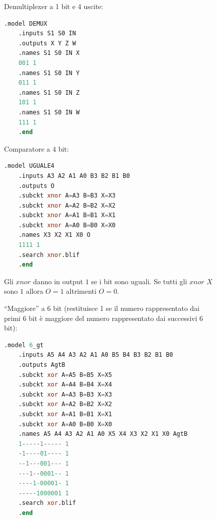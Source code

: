 \documentclass[a4paper]{article}
\theoremstyle{break}
\theoremstyle{break}
\theoremstyle{break}
\theoremstyle{break}
\begin{document}
\begin{figure}[H]
  \begin{example}
    Demultiplexer a 1 bit e 4 uscite:
    \begin{lstlisting}[language=Verilog]
    .model DEMUX
    .inputs S1 S0 IN
    .outputs X Y Z W
    .names S1 S0 IN X
    001 1
    .names S1 S0 IN Y
    011 1
    .names S1 S0 IN Z
    101 1
    .names S1 S0 IN W
    111 1
    .end
    \end{lstlisting}
  \end{example}
\end{figure}
\begin{figure}[H]
  \begin{example}
    Comparatore a 4 bit:
    \begin{lstlisting}[language=Verilog]
    .model UGUALE4
    .inputs A3 A2 A1 A0 B3 B2 B1 B0
    .outputs O
    .subckt xnor A=A3 B=B3 X=X3
    .subckt xnor A=A2 B=B2 X=X2
    .subckt xnor A=A1 B=B1 X=X1
    .subckt xnor A=A0 B=B0 X=X0
    .names X3 X2 X1 X0 O
    1111 1
    .search xnor.blif
    .end
    \end{lstlisting}
    Gli \( xnor \) danno in output \( 1 \) se i bit sono uguali. Se tutti gli \( xnor \) \( X \) 
    sono \( 1 \) allora \( O=1 \) altrimenti \( O=0 \).
  \end{example}
\end{figure}
\begin{figure}[H]
  \begin{example}
    “Maggiore” a 6 bit (restituisce 1 se il numero rappresentato dai primi 6 bit è
    maggiore del numero rappresentato dai successivi 6 bit):
    \begin{lstlisting}[language=Verilog]
    .model 6_gt
    .inputs A5 A4 A3 A2 A1 A0 B5 B4 B3 B2 B1 B0
    .outputs AgtB
    .subckt xor A=A5 B=B5 X=X5
    .subckt xor A=A4 B=B4 X=X4
    .subckt xor A=A3 B=B3 X=X3
    .subckt xor A=A2 B=B2 X=X2
    .subckt xor A=A1 B=B1 X=X1
    .subckt xor A=A0 B=B0 X=X0
    .names A5 A4 A3 A2 A1 A0 X5 X4 X3 X2 X1 X0 AgtB
    1-----1----- 1
    -1----01---- 1
    --1---001--- 1
    ---1--0001-- 1
    ----1-00001- 1
    -----1000001 1
    .search xor.blif
    .end
    \end{lstlisting}
  \end{example}
\end{figure}
\end{document}
